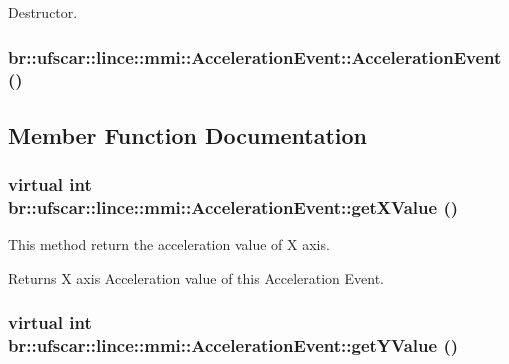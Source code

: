 Destructor. 

\hypertarget{classbr_1_1ufscar_1_1lince_1_1mmi_1_1AccelerationEvent_aaf9298b6242c8894e04111a344add1fe}{
\subsubsection[{AccelerationEvent}]{\setlength{\rightskip}{0pt plus 5cm}br::ufscar::lince::mmi::AccelerationEvent::AccelerationEvent ()}}
\label{classbr_1_1ufscar_1_1lince_1_1mmi_1_1AccelerationEvent_aaf9298b6242c8894e04111a344add1fe}


\subsection{Member Function Documentation}
\hypertarget{classbr_1_1ufscar_1_1lince_1_1mmi_1_1AccelerationEvent_a3e4798af9e022dbf7cdef27976437956}{
\subsubsection[{getXValue}]{\setlength{\rightskip}{0pt plus 5cm}virtual int br::ufscar::lince::mmi::AccelerationEvent::getXValue ()}}
\label{classbr_1_1ufscar_1_1lince_1_1mmi_1_1AccelerationEvent_a3e4798af9e022dbf7cdef27976437956}


This method return the acceleration value of X axis. 

\begin{DoxyReturn}{Returns}
X axis Acceleration value of this Acceleration Event. 
\end{DoxyReturn}
\hypertarget{classbr_1_1ufscar_1_1lince_1_1mmi_1_1AccelerationEvent_aa647428aca2ae84a2b9a58d5dd51ebb0}{
\subsubsection[{getYValue}]{\setlength{\rightskip}{0pt plus 5cm}virtual int br::ufscar::lince::mmi::AccelerationEvent::getYValue ()}}
\label{classbr_1_1ufscar_1_1lince_1_1mmi_1_1AccelerationEvent_aa647428aca2ae84a2b9a58d5dd51ebb0}


